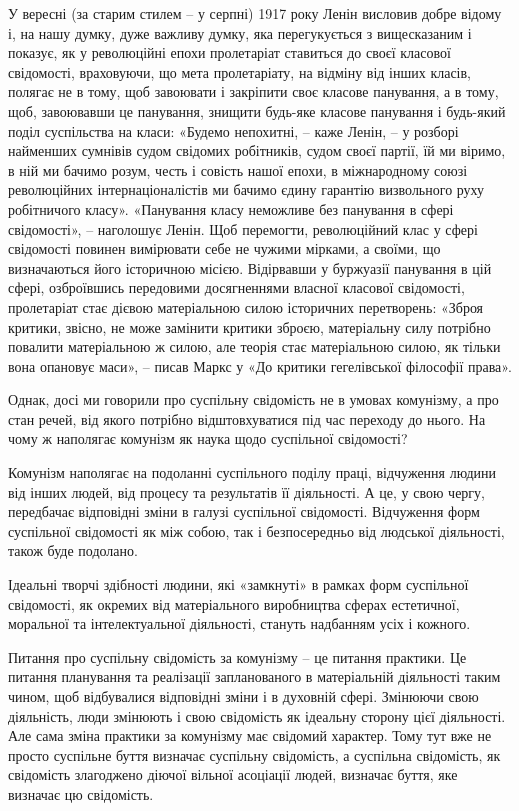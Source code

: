 \documentclass[../main]{subfiles}
\begin{document}
У вересні (за старим стилем – у серпні) 1917 року Ленін висловив добре відому і, на нашу думку, дуже важливу думку, яка перегукується з вищесказаним і показує, як у революційні епохи пролетаріат ставиться до своєї класової свідомості, враховуючи, що мета пролетаріату, на відміну від інших класів, полягає не в тому, щоб завоювати і закріпити своє класове панування, а в тому, щоб, завоювавши це панування, знищити будь-яке класове панування і будь-який поділ суспільства на класи: «Будемо непохитні, – каже Ленін, – у розборі найменших сумнівів судом свідомих робітників, судом своєї партії, їй ми віримо, в ній ми бачимо розум, честь і совість нашої епохи, в міжнародному союзі революційних інтернаціоналістів ми бачимо єдину гарантію визвольного руху робітничого класу». «Панування класу неможливе без панування в сфері свідомості», – наголошує Ленін. Щоб перемогти, революційний клас у сфері свідомості повинен вимірювати себе не чужими мірками, а своїми, що визначаються його історичною місією. Відірвавши у буржуазії панування в цій сфері, озброївшись передовими досягненнями власної класової свідомості, пролетаріат стає дієвою матеріальною силою історичних перетворень: «Зброя критики, звісно, не може замінити критики зброєю, матеріальну силу потрібно повалити матеріальною ж силою, але теорія стає матеріальною силою, як тільки вона опановує маси», – писав Маркс у «До критики гегелівської філософії права».

Однак, досі ми говорили про суспільну свідомість не в умовах комунізму, а про стан речей, від якого потрібно відштовхуватися під час переходу до нього. На чому ж наполягає комунізм як наука щодо суспільної свідомості?

Комунізм наполягає на подоланні суспільного поділу праці, відчуження людини від інших людей, від процесу та результатів її діяльності. А це, у свою чергу, передбачає відповідні зміни в галузі суспільної свідомості. Відчуження форм суспільної свідомості як між собою, так і безпосередньо від людської діяльності, також буде подолано.

Ідеальні творчі здібності людини, які «замкнуті» в рамках форм суспільної свідомості, як окремих від матеріального виробництва сферах естетичної, моральної та інтелектуальної діяльності, стануть надбанням усіх і кожного.

Питання про суспільну свідомість за комунізму – це питання практики. Це питання планування та реалізації запланованого в матеріальній діяльності таким чином, щоб відбувалися відповідні зміни і в духовній сфері. Змінюючи свою діяльність, люди змінюють і свою свідомість як ідеальну сторону цієї діяльності. Але сама зміна практики за комунізму має свідомий характер. Тому тут вже не просто суспільне буття визначає суспільну свідомість, а суспільна свідомість, як свідомість злагоджено діючої вільної асоціації людей, визначає буття, яке визначає цю свідомість.
\end{document}
